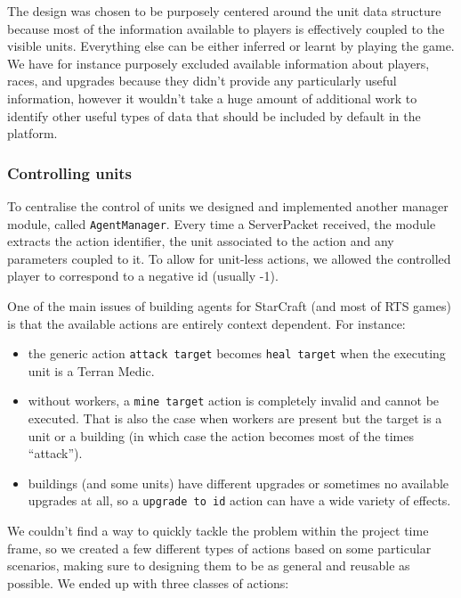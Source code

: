 The design was chosen to be purposely centered around the unit data structure
because most of the information available to players is effectively coupled to
the visible units. Everything else can be either inferred or learnt by playing
the game. We have for instance purposely excluded available information about
players, races, and upgrades because they didn't provide any particularly useful
information, however it wouldn't take a huge amount of additional work to
identify other useful types of data that should be included by default in the
platform.


\subsubsection{Controlling units}

To centralise the control of units we designed and implemented another manager
module, called \texttt{AgentManager}. Every time a ServerPacket received, the
module extracts the action identifier, the unit associated to the action and any
parameters coupled to it. To allow for unit-less actions, we allowed the
controlled player to correspond to a negative id (usually -1).

One of the main issues of building agents for StarCraft (and most of RTS games)
is that the available actions are entirely context dependent. 
For instance:

\begin{itemize}
\item the generic action \texttt{attack target} becomes \texttt{heal target}
  when the executing unit is a Terran Medic.
\item without workers, a \texttt{mine target} action is completely invalid and
  cannot be executed. That is also the case when workers are present but the
  target is a unit or a building (in which case the action becomes most of the
  times ``attack'').
\item buildings (and some units) have different upgrades or sometimes no
  available upgrades at all, so a \texttt{upgrade to id} action can have a wide
  variety of effects.
\end{itemize} 

We couldn't find a way to quickly tackle the problem within the project
time frame, so we created a few different types of actions based on some
particular scenarios, making sure to designing them to be as general and
reusable as possible. We ended up with three classes of actions:

